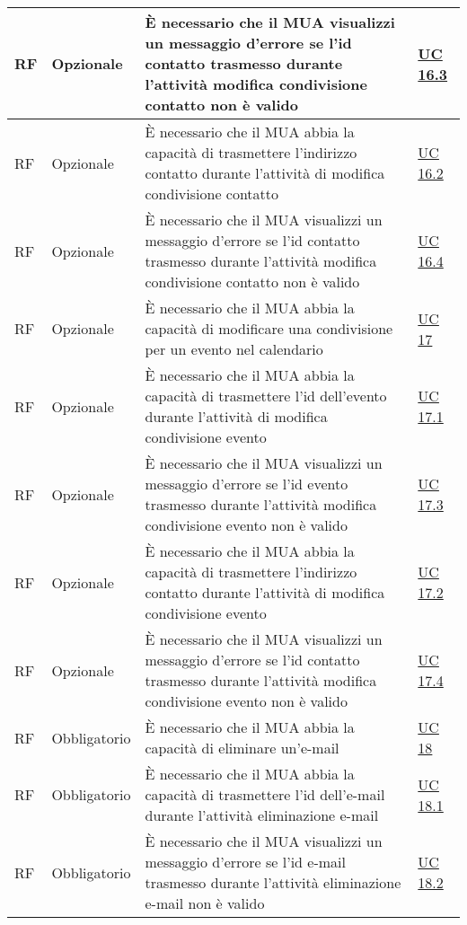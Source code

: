 \begin{longtable}{*{1}{>{\centering\arraybackslash}p{1.5cm}}*{1}{>{\centering\arraybackslash}p{2.5cm}}p{6cm}*{1}{>{\centering\arraybackslash}p{3cm}}}
    \\\hline
    RF & Opzionale & È necessario che il MUA visualizzi un messaggio d'errore se l'id contatto trasmesso durante l'attività modifica condivisione contatto non è valido & \hyperref[sec:UC16.3]{UC 16.3}
    \\\hline
    RF & Opzionale & È necessario che il MUA abbia la capacità di trasmettere l'indirizzo contatto durante l'attività di modifica condivisione contatto & \hyperref[sec:UC16.2]{UC 16.2}
    \\\hline
    RF & Opzionale & È necessario che il MUA visualizzi un messaggio d'errore se l'id contatto trasmesso durante l'attività modifica condivisione contatto non è valido & \hyperref[sec:UC16.4]{UC 16.4}
    \\\hline
    RF & Opzionale & È necessario che il MUA abbia la capacità di modificare una condivisione per un evento nel calendario & \hyperref[sec:UC17]{UC 17}
    \\\hline
    RF & Opzionale & È necessario che il MUA abbia la capacità di trasmettere l'id dell'evento durante l'attività di modifica condivisione evento & \hyperref[sec:UC17.1]{UC 17.1}
    \\\hline
    RF & Opzionale & È necessario che il MUA visualizzi un messaggio d'errore se l'id evento trasmesso durante l'attività modifica condivisione evento non è valido & \hyperref[sec:UC17.3]{UC 17.3}
    \\\hline
    RF & Opzionale & È necessario che il MUA abbia la capacità di trasmettere l'indirizzo contatto durante l'attività di modifica condivisione evento & \hyperref[sec:UC17.2]{UC 17.2}
    \\\hline
    RF & Opzionale & È necessario che il MUA visualizzi un messaggio d'errore se l'id contatto trasmesso durante l'attività modifica condivisione evento non è valido & \hyperref[sec:UC17.4]{UC 17.4}
    \\\hline
    RF & Obbligatorio & È necessario che il MUA abbia la capacità di eliminare un'e-mail & \hyperref[sec:UC18]{UC 18}
    \\\hline
    RF & Obbligatorio & È necessario che il MUA abbia la capacità di trasmettere l'id dell'e-mail durante l'attività eliminazione e-mail & \hyperref[sec:UC18.1]{UC 18.1}
    \\\hline
    RF & Obbligatorio & È necessario che il MUA visualizzi un messaggio d'errore se l'id e-mail trasmesso durante l'attività eliminazione e-mail non è valido & \hyperref[sec:UC18.2]{UC 18.2}
    \\\hline

\end{longtable}
